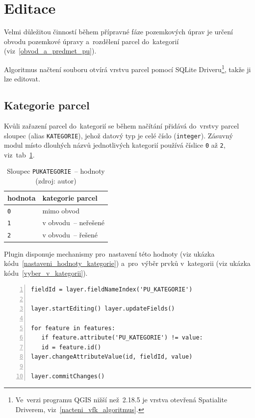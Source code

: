 \newpage

\section{Editace}
\label{editace}

Velmi důležitou činností během přípravné fáze pozemkových úprav je
určení obvodu pozemkové úpravy a~rozdělení parcel do~kategorií
(viz~\ref{obvod_a_predmet_pu}).

Algoritmus načtení  souboru otvírá vrstvu parcel pomocí SQLite
Driveru\footnote{Ve~verzi programu QGIS nižší než~2.18.5 je vrstva
otevřená Spatialite Driverem, viz~\ref{nacteni_vfk_algoritmus}.},
takže ji lze editovat.

\subsection{Kategorie parcel}
\label{kategorie_parcel}

Kvůli zařazení parcel do~kategorií se během načítání přidává do~vrstvy
parcel sloupec \texttt{} (alias
\texttt{KATEGORIE}), jehož datový typ je celé číslo
(\texttt{integer}). Zásuvný modul místo dlouhých názvů jednotlivých
kategorií používá číslice \texttt{0} až \texttt{2},
viz~tab~\ref{tab:kategorie_hodnoty}.

\begin{table}[H]
    \begin{tabular}{|l|l|} \hline hodnota & kategorie parcel \\ \hline
\hline \texttt{0} & mimo obvod \\ \hline \texttt{1} & v obvodu~–
neřešené \\ \hline \texttt{2} & v obvodu~– řešené \\ \hline
    \end{tabular} \centering
    \caption[Sloupec \texttt{PU\textunderscore KATEGORIE}~–
hodnoty]{Sloupec \texttt{PU\textunderscore KATEGORIE}~– hodnoty (zdroj: autor)}
    \label{tab:kategorie_hodnoty}
\end{table}

Plugin disponuje mechanismy pro~nastavení této hodnoty (viz ukázka
kódu~\ref{nastaveni_hodnoty_kategorie}) a~pro~výběr prvků v~kategorii
(viz ukázka kódu~\ref{vyber_v_kategorii}).

{\scriptsize
\begin{lstlisting}[style=python, caption={Kategorie parcel~– nastavení
hodnoty}, captionpos=b, label=nastaveni_hodnoty_kategorie,
backgroundcolor = \color{light-gray}, numbers=left]
fieldId = layer.fieldNameIndex('PU_KATEGORIE')

layer.startEditing() layer.updateFields()

for feature in features:
   if feature.attribute('PU_KATEGORIE') != value:
   id = feature.id()
layer.changeAttributeValue(id, fieldId, value)

layer.commitChanges()
\end{lstlisting}}

